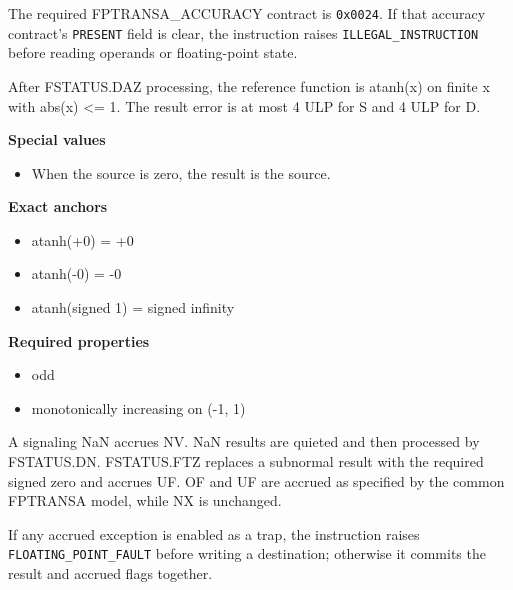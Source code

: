 The required FPTRANSA\_ACCURACY contract is \texttt{0x0024}. If that accuracy contract's \texttt{PRESENT} field is clear, the instruction raises \texttt{ILLEGAL\_INSTRUCTION} before reading operands or floating-point state.

After FSTATUS.DAZ processing, the reference function is atanh(x) on finite x with abs(x) \textless{}= 1. The result error is at most 4 ULP for S and 4 ULP for D.

\textbf{Special values}\par
\begin{itemize}
\item When the source is zero, the result is the source.
\end{itemize}

\textbf{Exact anchors}\par
\begin{itemize}
\item atanh(+0) = +0
\item atanh(-0) = -0
\item atanh(signed 1) = signed infinity
\end{itemize}

\textbf{Required properties}\par
\begin{itemize}
\item odd
\item monotonically increasing on (-1, 1)
\end{itemize}

A signaling NaN accrues NV. NaN results are quieted and then processed by FSTATUS.DN. FSTATUS.FTZ replaces a subnormal result with the required signed zero and accrues UF. OF and UF are accrued as specified by the common FPTRANSA model, while NX is unchanged.

If any accrued exception is enabled as a trap, the instruction raises \texttt{FLOATING\_POINT\_FAULT} before writing a destination; otherwise it commits the result and accrued flags together.
